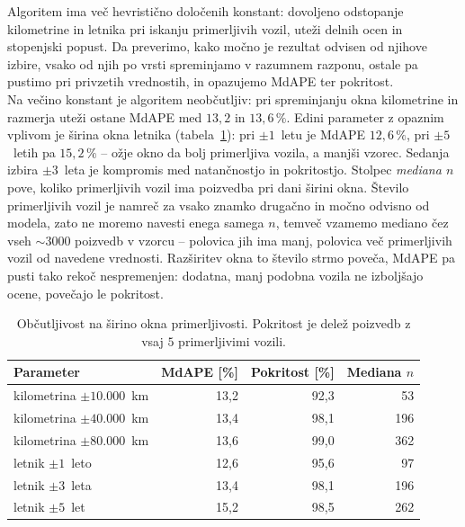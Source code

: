 Algoritem ima več hevristično določenih konstant: dovoljeno odstopanje
kilometrine in letnika pri iskanju primerljivih vozil, uteži delnih ocen in
stopenjski popust. Da preverimo, kako močno je rezultat odvisen od njihove
izbire, vsako od njih po vrsti spreminjamo v razumnem razponu, ostale pa
pustimo pri privzetih vrednostih, in opazujemo MdAPE ter pokritost.\\
Na večino konstant je algoritem neobčutljiv: pri spreminjanju okna kilometrine in
razmerja uteži ostane MdAPE med $13{,}2$ in
$13{,}6\,\%$. Edini parameter z opaznim vplivom je širina okna letnika
(tabela~\ref{tab:sens-okno}): pri $\pm 1$~letu je MdAPE $12{,}6\,\%$, pri
$\pm 5$~letih pa $15{,}2\,\%$ -- ožje okno da bolj primerljiva vozila, a
manjši vzorec. Sedanja izbira $\pm 3$~leta je kompromis med
natančnostjo in pokritostjo.
Stolpec \emph{mediana $n$} pove, koliko primerljivih vozil ima
poizvedba pri dani širini okna. Število primerljivih vozil je
namreč za vsako znamko drugačno in močno odvisno od modela, zato ne moremo navesti enega samega $n$,
temveč vzamemo mediano čez vseh $\sim\!3000$ poizvedb v vzorcu -- polovica jih
ima manj, polovica več primerljivih vozil od navedene vrednosti. Razširitev
okna to število strmo poveča, MdAPE pa pusti
tako rekoč nespremenjen: dodatna, manj podobna vozila ne izboljšajo ocene,
povečajo le pokritost.
\begin{table}[H]
  \centering
  \caption{Občutljivost na širino okna primerljivosti. Pokritost je delež
  poizvedb z vsaj $5$ primerljivimi vozili.}
  \label{tab:sens-okno}
  \setlength{\tabcolsep}{5pt}
  \begin{tabular}{l r r r}
    \toprule
    \textbf{Parameter} & \textbf{MdAPE [\%]} & \textbf{Pokritost [\%]} & \textbf{Mediana $n$} \\
    \midrule
    kilometrina $\pm 10.000$~km & 13{,}2 & 92{,}3 & 53 \\
    kilometrina $\pm 40.000$~km & 13{,}4 & 98{,}1 & 196 \\
    kilometrina $\pm 80.000$~km & 13{,}6 & 99{,}0 & 362 \\
    \midrule
    letnik $\pm 1$~leto  & 12{,}6 & 95{,}6 & 97 \\
    letnik $\pm 3$~leta  & 13{,}4 & 98{,}1 & 196 \\
    letnik $\pm 5$~let   & 15{,}2 & 98{,}5 & 262 \\
    \bottomrule
  \end{tabular}
\end{table}

